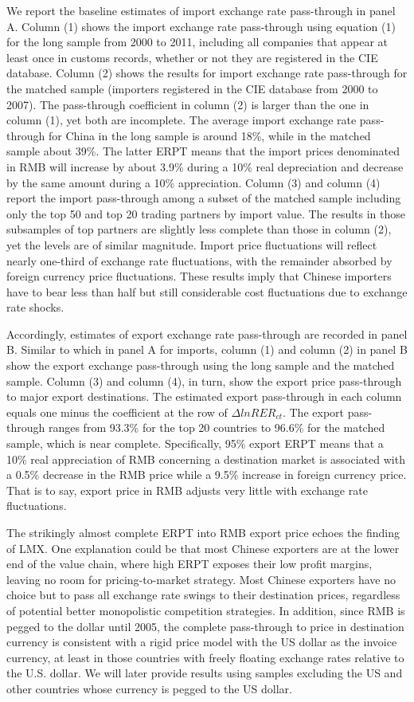 \documentclass[12pt]{article}
\begin{document}
We report the baseline estimates of import exchange rate pass-through in panel A. Column (1) shows the import exchange rate pass-through using equation (1) for the long sample from 2000 to 2011, including all companies that appear at least once in customs records, whether or not they are registered in the CIE database. Column (2) shows the results for import exchange rate pass-through for the matched sample (importers registered in the CIE database from 2000 to 2007). The pass-through coefficient in column (2) is larger than the one in column (1), yet both are incomplete. The average import exchange rate pass-through for China in the long sample is around 18\%, while in the matched sample about 39\%. The latter ERPT means that the import prices denominated in RMB will increase by about 3.9\% during a 10\% real depreciation and decrease by the same amount during a 10\% appreciation. Column (3) and column (4) report the import pass-through among a subset of the matched sample including only the top 50 and top 20 trading partners by import value. The results in those subsamples of top partners are slightly less complete than those in column (2), yet the levels are of similar magnitude. Import price fluctuations will reflect nearly one-third of exchange rate fluctuations, with the remainder absorbed by foreign currency price fluctuations. These results imply that Chinese importers have to bear less than half but still considerable cost fluctuations due to exchange rate shocks. 

Accordingly, estimates of export exchange rate pass-through are recorded in panel B. Similar to which in panel A for imports, column (1) and column (2) in panel B show the export exchange pass-through using the long sample and the matched sample. Column (3) and column (4), in turn, show the export price pass-through to major export destinations. The estimated export pass-through in each column equals one minus the coefficient at the row of $\Delta lnRER_{ct}$. The export pass-through ranges from 93.3\% for the top 20 countries to 96.6\% for the matched sample, which is near complete. Specifically, 95\% export ERPT means that a 10\% real appreciation of RMB concerning a destination market is associated with a 0.5\% decrease in the RMB price while a 9.5\% increase in foreign currency price. That is to say, export price in RMB adjusts very little with exchange rate fluctuations.

The strikingly almost complete ERPT into RMB export price echoes the finding of LMX\cite{lmx2015}. One explanation could be that most Chinese exporters are at the lower end of the value chain, where high ERPT exposes their low profit margins, leaving no room for pricing-to-market strategy. Most Chinese exporters have no choice but to pass all exchange rate swings to their destination prices, regardless of potential better monopolistic competition strategies. In addition, since RMB is pegged to the dollar until 2005, the complete pass-through to price in destination currency is consistent with a rigid price model with the US dollar as the invoice currency, at least in those countries with freely floating exchange rates relative to the U.S. dollar. We will later provide results using samples excluding the US and other countries whose currency is pegged to the US dollar.
\end{document}
